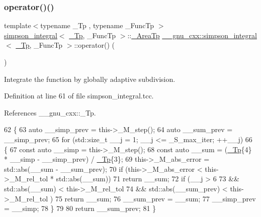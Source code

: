 \subsubsection{\texorpdfstring{operator()()}{operator()()}\hspace{0.1cm}{\footnotesize\ttfamily [1/2]}}
{\footnotesize\ttfamily template$<$typename \+\_\+\+Tp , typename \+\_\+\+Func\+Tp $>$ \\
\hyperlink{class____gnu__cxx_1_1simpson__integral}{simpson\+\_\+integral}$<$ \hyperlink{namespace____gnu__cxx_a3b19a9c800ca194374ef9172290f7d79}{\+\_\+\+Tp}, \+\_\+\+Func\+Tp $>$\+::\hyperlink{class____gnu__cxx_1_1simpson__integral_a4d84c87903e8359f4a617e08703c15a1}{\+\_\+\+Area\+Tp} \hyperlink{class____gnu__cxx_1_1simpson__integral}{\+\_\+\+\_\+gnu\+\_\+cxx\+::simpson\+\_\+integral}$<$ \hyperlink{namespace____gnu__cxx_a3b19a9c800ca194374ef9172290f7d79}{\+\_\+\+Tp}, \+\_\+\+Func\+Tp $>$\+::operator() (\begin{DoxyParamCaption}{ }\end{DoxyParamCaption})}

Integrate the function by globally adaptive subdivision. 

Definition at line 61 of file simpson\+\_\+integral.\+tcc.



References \+\_\+\+\_\+gnu\+\_\+cxx\+::\+\_\+\+Tp.


\begin{DoxyCode}
62     \{
63       \textcolor{keyword}{auto} \_\_simp\_prev = this->\_M\_step();
64       \textcolor{keyword}{auto} \_\_sum\_prev = \_\_simp\_prev;
65       \textcolor{keywordflow}{for} (std::size\_t \_\_j = 1; \_\_j <= \_S\_max\_iter; ++\_\_j)
66         \{
67           \textcolor{keyword}{const} \textcolor{keyword}{auto} \_\_simp = this->\_M\_step();
68           \textcolor{keyword}{const} \textcolor{keyword}{auto} \_\_sum = (\hyperlink{namespace____gnu__cxx_a3b19a9c800ca194374ef9172290f7d79}{\_Tp}\{4\} * \_\_simp - \_\_simp\_prev) / \hyperlink{namespace____gnu__cxx_a3b19a9c800ca194374ef9172290f7d79}{\_Tp}\{3\};
69           this->\_M\_abs\_error = std::abs(\_\_sum - \_\_sum\_prev);
70           \textcolor{keywordflow}{if} (this->\_M\_abs\_error < this->\_M\_rel\_tol * std::abs(\_\_sum))
71             \textcolor{keywordflow}{return} \_\_sum;
72           \textcolor{keywordflow}{if} (\_\_j > 6
73                 && std::abs(\_\_sum) < this->\_M\_rel\_tol
74                 && std::abs(\_\_sum\_prev) < this->\_M\_rel\_tol  )
75             \textcolor{keywordflow}{return} \_\_sum;
76           \_\_sum\_prev = \_\_sum;
77           \_\_simp\_prev = \_\_simp;
78         \}
79 
80       \textcolor{keywordflow}{return} \_\_sum\_prev;
81     \}
\end{DoxyCode}
\mbox{\label{class____gnu__cxx_1_1simpson__integral_a09e6a430b486fde23bcba7130935c105}} 
